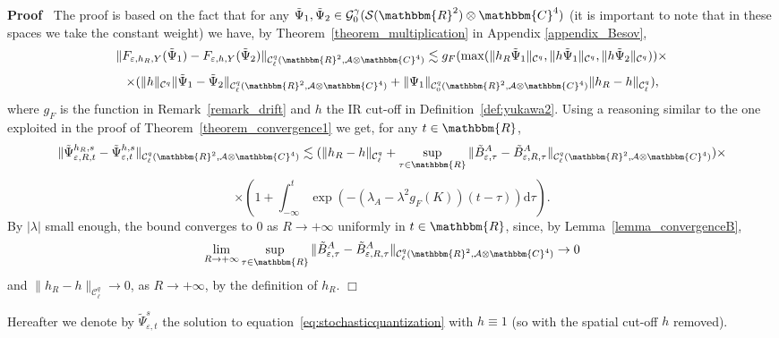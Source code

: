 \documentclass[11pt]{article}
\newcommand{\mathd}{\mathrm{d}}
\newenvironment{proof}{\noindent\textbf{Proof\ }}{\hspace*{\fill}$\Box$\medskip}
\begin{document}
\begin{proof}
  The proof is based on the fact that for any $\tilde{\Psi}_1, \tilde{\Psi}_2
  \in \mathcal{} \mathcal{G}^{\gamma}_0 (\mathcal{S} (\mathbbm{R}^2) \otimes
  \mathbbm{C}^4)$ (it is important to note that in these spaces we take the
  constant weight) we have, by Theorem~\ref{theorem_multiplication} in
  Appendix \ref{appendix_Besov},
  \[ \| F_{\varepsilon, h_R, Y} (\tilde{\Psi}_1) - F_{\varepsilon, h, Y}
     (\tilde{\Psi}_2) \|_{\mathcal{C}^q_{\ell} (\mathbbm{R}^2, \mathcal{A}
     \otimes \mathbbm{C}^4)} \lesssim g_F (\max (\| h_R \tilde{\Psi}_1
     \|_{\mathcal{C}^q}, \| h \tilde{\Psi}_1 \|_{\mathcal{C}^q}, \| h
     \tilde{\Psi}_2 \|_{\mathcal{C}^q})) \times \]
  \begin{equation}
    \times (\| h \|_{\mathcal{C}^q} \| \tilde{\Psi}_1 - \tilde{\Psi}_2
    \|_{\mathcal{C}^q_{\ell} (\mathbbm{R}^2, \mathcal{A} \otimes \mathbbm{C}^4)}
    + \| \Psi_1 \|_{\mathcal{C}^q_0 (\mathbbm{R}^2, \mathcal{A} \otimes
    \mathbbm{C}^4)} \| h_R - h \|_{\mathcal{C}^q_{\ell}})
    \label{eq:inequalityh},
  \end{equation}
  where $g_F$ is the function in Remark~\ref{remark_drift} and $h$ the IR
  cut-off in Definition~\ref{def:yukawa2}. Using a reasoning similar to the
  one exploited in the proof of Theorem~\ref{theorem_convergence1} we get, for
  any $t \in \mathbbm{R}$,
  \[ \| \tilde{\Psi}_{\varepsilon, R, t}^{h_R, s} -
     \tilde{\Psi}_{\varepsilon, t}^{h, s} \|_{\mathcal{C}^q_{\ell}
     (\mathbbm{R}^2, \mathcal{A} \otimes \mathbbm{C}^4)} \lesssim (\| h_R - h
     \|_{\mathcal{C}^q_{\ell}} + \sup_{\tau \in \mathbbm{R}} \|
     \tilde{B}_{\varepsilon, \tau}^A - \tilde{B}^A_{\varepsilon, R, \tau}
     \|_{\mathcal{C}^q_{\ell} (\mathbbm{R}^2, \mathcal{A} \otimes
     \mathbbm{C}^4)}) \times \]
  \[ \times \left( 1 + \int_{- \infty}^t \exp (- (\lambda_A - \lambda^2 g_F
     (K)) (t - \tau)) \mathd \tau \right) . \]
  By $| \lambda |$ small enough, the bound converges to $0$ as $R \rightarrow
  + \infty$ uniformly in $t \in \mathbbm{R}$, since, by
  Lemma~\ref{lemma_convergenceB},
  \[ \lim_{R \rightarrow + \infty} \sup_{\tau \in \mathbbm{R}} \|
     \tilde{B}_{\varepsilon, \tau}^A - \tilde{B}^A_{\varepsilon, R, \tau}
     \|_{\mathcal{C}^q_{\ell} (\mathbbm{R}^2, \mathcal{A} \otimes
     \mathbbm{C}^4)} \rightarrow 0 \]
  and $\| h_R - h \|_{\mathcal{C}^q_{\ell}} \rightarrow 0$, as $R \rightarrow
  + \infty$, by the definition of $h_R$.
\end{proof}

Hereafter we denote by $\tilde{\Psi}_{\varepsilon, t}^s$ the solution to
equation~{\eqref{eq:stochasticquantization}} with $h \equiv 1$ (so with the
spatial cut-off $h$ removed).
\end{document}
